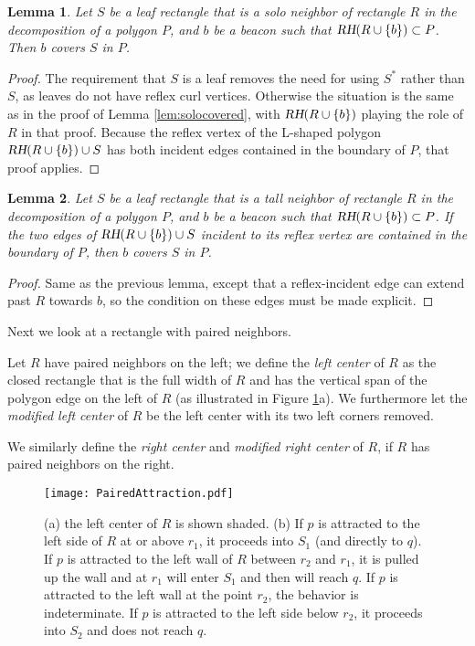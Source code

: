 \documentclass{article}
\newtheorem{lemma}{Lemma}
\newcommand{\RH}[1]{\textsl{RH}\ensuremath{(#1)}}
\begin{document}
	\begin{lemma}\label{lem:sololeafcovered}
		Let $S$ be a leaf rectangle that is a solo neighbor of rectangle $R$ in the
		decomposition of a polygon $P$, and $b$ be a beacon such that 
		$\RH{R \cup \{b\}} \subset P$.  Then $b$ covers $S$ in $P$.
	\end{lemma}
	\begin{proof}
	The requirement that $S$ is a leaf removes the need for using $S^*$ rather than
	$S$, as leaves do not have reflex curl vertices. Otherwise the situation is the
	same as in the proof of Lemma \ref{lem:solocovered}, with $\RH{R \cup \{b\}}$
	playing the role of $R$ in that proof.  Because the reflex vertex of the
	L-shaped polygon $\RH{R \cup \{b\}} \cup S$ has both incident edges contained
	in the boundary of $P$, that proof applies.
	\end{proof}
	
	
	\begin{lemma}\label{lem:tallleafcovered}
		Let $S$ be a leaf rectangle that is a tall neighbor of rectangle $R$ in the
		decomposition of a polygon $P$, and $b$ be a beacon such that 
		$\RH{R \cup \{b\}} \subset P$.  If the two edges of $\RH{R \cup \{b\}} \cup
		S$ incident to its reflex vertex are contained in the boundary of $P$, then
		$b$ covers $S$ in $P$.
	\end{lemma}
	\begin{proof}
		Same as the previous lemma, except that a reflex-incident edge can extend
		past $R$ towards $b$, so the condition on these edges must be made explicit.
	\end{proof}
	
	Next we look at a rectangle with paired neighbors.
	
	Let $R$ have paired neighbors on the left; we define the 
	\emph{left center} of $R$ as the closed
	rectangle that is the full width of $R$ and has the vertical span of 
	the polygon edge on the left of $R$ (as illustrated in Figure
	\ref{fig:pairedattraction}a).
	We furthermore let the \emph{modified left center} of $R$
	be the left center with its two left corners removed.
	
	We similarly define the \emph{right center} and \emph{modified right center} of
	$R$, if $R$ has paired neighbors on the right.
	
	\begin{figure}[htbp] 
		\begin{center}
		    \texttt{[image: PairedAttraction.pdf]} 
		\end{center}
		\caption{
			(a) the left center of $R$ is shown shaded.
			(b) If $p$ is attracted to the left side of $R$ at or above $r_1$, it
			    proceeds into $S_1$ (and directly to $q$). If $p$ is attracted to the
			    left wall of $R$ between $r_2$ and $r_1$, it is pulled up the wall and at
			    $r_1$ will enter $S_1$ and then will reach $q$.
				If $p$ is attracted to the left wall at the point $r_2$, the behavior is
				indeterminate.
				If $p$ is attracted to the left side below $r_2$, it proceeds into $S_2$ and
				does not reach $q$.
		}
		\label{fig:pairedattraction}
	\end{figure}
	
\end{document}

